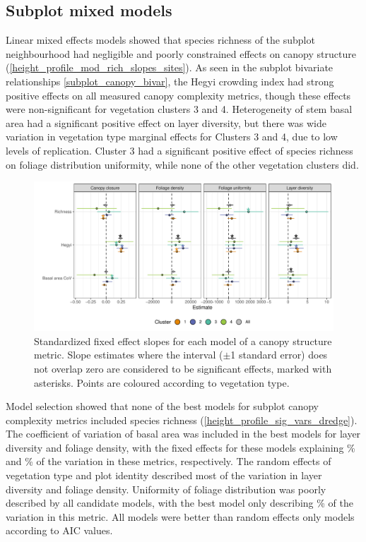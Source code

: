 \documentclass[11pt,a4paper]{article}
\begin{document}
\subsection{Subplot mixed models}

Linear mixed effects models showed that species richness of the subplot neighbourhood had negligible and poorly constrained effects on canopy structure (\autoref{height_profile_mod_rich_slopes_sites}). As seen in the subplot bivariate relationships \autoref{subplot_canopy_bivar}, the Hegyi crowding index had strong positive effects on all measured canopy complexity metrics, though these effects were non-significant for vegetation clusters 3 and 4. Heterogeneity of stem basal area had a significant positive effect on layer diversity, but there was wide variation in vegetation type marginal effects for Clusters 3 and 4, due to low levels of replication. Cluster 3 had a significant positive effect of species richness on foliage distribution uniformity, while none of the other vegetation clusters did.

\begin{figure}
	\includegraphics[width=\linewidth]{height_profile_mod_rich_slopes_sites}
	\caption{Standardized fixed effect slopes for each model of a canopy structure metric. Slope estimates where the interval ($\pm$1 standard error) does not overlap zero are considered to be significant effects, marked with asterisks. Points are coloured according to vegetation type.}
	\label{height_profile_mod_rich_slopes_sites}
\end{figure}

Model selection showed that none of the best models for subplot canopy complexity metrics included species richness (\autoref{height_profile_sig_vars_dredge}). The coefficient of variation of basal area was included in the best models for layer diversity and foliage density, with the fixed effects for these models explaining \bestLayerDivRsqS\% and \bestDensRsqS\% of the variation in these metrics, respectively. The random effects of vegetation type and plot identity described most of the variation in layer diversity and foliage density. Uniformity of foliage distribution was poorly described by all candidate models, with the best model only describing \bestUnifRsqS\% of the variation in this metric. All models were better than random effects only models according to AIC values.
\end{document}
